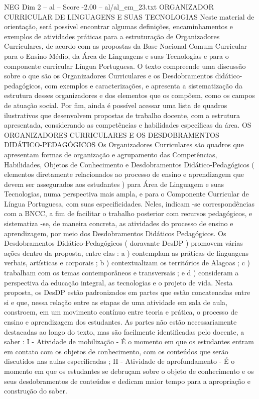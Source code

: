 \begin{textsample}{NEG Dim 2 – al – Score -2.00 – al/al\_em\_23.txt}  \label{ex:f2_neg_029}
ORGANIZADOR CURRICULAR DE LINGUAGENS E SUAS TECNOLOGIAS Neste material de orientação, será possível encontrar algumas definições, encaminhamentos e exemplos de atividades práticas para a estruturação de Organizadores Curriculares, de acordo com as propostas da Base Nacional Comum Curricular para o Ensino Médio, da Área de Linguagens e suas Tecnologias e para o componente curricular Língua Portuguesa.
O texto compreende uma discussão sobre o que são os Organizadores Curriculares e os Desdobramentos didático-pedagógicos, com exemplos e caracterizações, e apresenta a sistematização da estrutura desses organizadores e dos elementos que os compõem, como os campos de atuação social.
Por fim, ainda é possível acessar uma lista de quadros ilustrativos que desenvolvem propostas de trabalho docente, com a estrutura apresentada, considerando as competências e habilidades específicas da área.
OS ORGANIZADORES CURRICULARES E OS DESDOBRAMENTOS DIDÁTICO-PEDAGÓGICOS Os Organizadores Curriculares são quadros que apresentam formas de organização e agrupamento das Competências, Habilidades, Objetos de Conhecimento e Desdobramentos Didático-Pedagógicos ( elementos diretamente relacionados ao processo de ensino e aprendizagem que devem ser assegurados aos estudantes ) para Área de Linguagem e suas Tecnologias, numa perspectiva mais ampla, e para o Componente Curricular de Língua Portuguesa, com suas especificidades.
Neles, indicam -se correspondências com a BNCC, a fim de facilitar o trabalho posterior com recursos pedagógicos, e sistematiza -se, de maneira concreta, as atividades do processo de ensino e aprendizagem, por meio dos Desdobramentos Didáticos Pedagógicos.
Os Desdobramentos Didático-Pedagógicos ( doravante DesDP ) promovem várias ações dentro da proposta, entre elas : a ) contemplam as práticas de linguagens verbais, artísticas e corporais ; b ) contextualizam os territórios de Alagoas ; c ) trabalham com os temas contemporâneos e transversais ; e d ) consideram a perspectiva da educação integral, as tecnologias e o projeto de vida.
Nesta proposta, os DesDP estão padronizados em partes que estão concatenadas entre si e que, nessa relação entre as etapas de uma atividade em sala de aula, constroem, em um movimento contínuo entre teoria e prática, o processo de ensino e aprendizagem dos estudantes.
As partes não estão necessariamente destacadas ao longo do texto, mas são facilmente identificadas pelo docente, a saber : I - Atividade de mobilização - É o momento em que os estudantes entram em contato com os objetos de conhecimento, com os conteúdos que serão discutidos nas aulas especificadas ; II - Atividade de aprofundamento - É o momento em que os estudantes se debruçam sobre o objeto de conhecimento e os seus desdobramentos de conteúdos e dedicam maior tempo para a apropriação e construção do saber.

\end{textsample}

